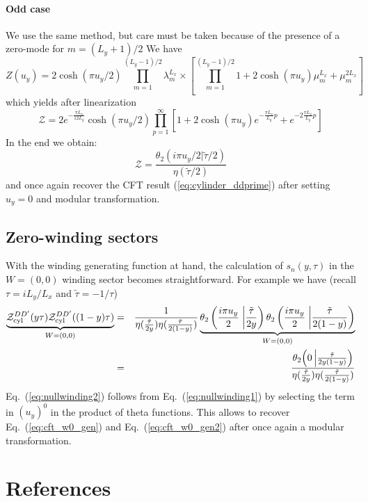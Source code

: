 \documentclass[11pt]{iopart}
\begin{document}
\paragraph{Odd case}
We use the same method, but care must be taken because of the presence of a zero-mode for $m=(L_y+1)/2$ We have
\begin{equation}
Z(u_y)=2\cosh(\pi u_y/2)\prod_{m=1}^{(L_y-1)/2} \lambda_m^{L_x}\times \left[\prod_{m=1}^{(L_y-1)/2} 1+2\cosh (\pi u_y)\mu_m^{L_x}+\mu_m^{2L_x}\right] 
\end{equation}
which yields after linearization
\begin{equation}
 \mathcal{Z}= 2 e^{-\frac{\pi L_x}{12 L_y}}\cosh(\pi u_y/2)\prod_{p=1}^{\infty}\left[1+2 \cosh (\pi u_y)e^{-\frac{\pi L_x}{L_y}p}+e^{-2\frac{\pi L_x}{L_y}p}\right]
\end{equation}
In the end we obtain:
\begin{equation}
 \mathcal{Z}=\frac{\theta_2(i \pi u_y/2|\tilde{\tau}/2)}{\eta(\tilde{\tau}/2)}
\end{equation}
and once again recover the CFT result (\ref{eq:cylinder_ddprime}) after setting $u_y=0$ and modular transformation. 
\subsection[\;\;\;\;\;\;\;\;\;\;\;\;\;\; Zero-winding sectors]{Zero-winding sectors}
With the winding generating function at hand, the calculation of $s_n(y,\tau)$ in the $W=(0,0)$ winding sector becomes straightforward. For example we have (recall $\tau=iL_y/L_x$ and $\tilde{\tau}=-1/\tau$)
\begin{eqnarray}\label{eq:nullwinding1}
\underbrace{\mathcal{Z}_{\rm cyl}^{DD^\prime}(y\tau)\mathcal{Z}_{\rm cyl}^{DD^\prime}((1-y)\tau)}_{W=(0,0)}&=&\frac{1}{\eta(\frac{\tilde{\tau}}{2y})\eta(\frac{\tilde{\tau}}{2(1-y)})} 
\underbrace{\theta_2\left(\frac{i \pi u_y}{2}\right.\left|\frac{\tilde{\tau}}{2y}\right)\theta_2\left(\frac{i \pi u_y}{2}\right.\left|\frac{\tilde{\tau}}{2(1-y)}\right)}_{W=(0,0)}\\\label{eq:nullwinding2}
&=&\frac{\theta_2\Big(0\left|\frac{\tilde{\tau}}{2y(1-y)}\right)}{\eta(\frac{\tilde{\tau}}{2y})\eta(\frac{\tilde{\tau}}{2(1-y)})}
\end{eqnarray}
Eq.~(\ref{eq:nullwinding2}) follows from Eq.~(\ref{eq:nullwinding1}) by selecting the term in $(u_y)^0$ in the product of theta functions. This allows to recover Eq.~(\ref{eq:cft_w0_gen}) and Eq.~(\ref{eq:cft_w0_gen2}) after once again a modular transformation. 
 \section*{References}
{}

\end{document}
